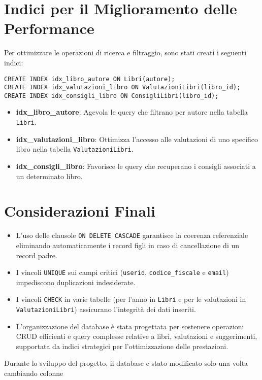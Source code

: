 \documentclass{report}
\begin{document}
\section{Indici per il Miglioramento delle Performance}
Per ottimizzare le operazioni di ricerca e filtraggio, sono stati creati i seguenti indici:

\begin{lstlisting}
CREATE INDEX idx_libro_autore ON Libri(autore);
CREATE INDEX idx_valutazioni_libro ON ValutazioniLibri(libro_id);
CREATE INDEX idx_consigli_libro ON ConsigliLibri(libro_id);
\end{lstlisting}

\begin{itemize}
    \item \textbf{idx\_libro\_autore}: Agevola le query che filtrano per autore nella tabella \texttt{Libri}.
    \item \textbf{idx\_valutazioni\_libro}: Ottimizza l'accesso alle valutazioni di uno specifico libro nella tabella \texttt{ValutazioniLibri}.
    \item \textbf{idx\_consigli\_libro}: Favorisce le query che recuperano i consigli associati a un determinato libro.
\end{itemize}


\section{Considerazioni Finali}
\begin{itemize}
    \item L'uso delle clausole \texttt{ON DELETE CASCADE} garantisce la coerenza referenziale eliminando automaticamente i record figli in caso di cancellazione di un record padre.
    \item I vincoli \texttt{UNIQUE} sui campi critici (\texttt{userid}, \texttt{codice\_fiscale} e \texttt{email}) impediscono duplicazioni indesiderate.
    \item I vincoli \texttt{CHECK} in varie tabelle (per l'anno in \texttt{Libri} e per le valutazioni in \texttt{ValutazioniLibri}) assicurano l'integrità dei dati inseriti.
    \item L'organizzazione del database è stata progettata per sostenere operazioni CRUD efficienti e query complesse relative a libri, valutazioni e suggerimenti, supportata da indici strategici per l'ottimizzazione delle prestazioni.
\end{itemize}

Durante lo sviluppo del progetto, il database e stato modificato solo una volta cambiando colonne 
\end{document}
